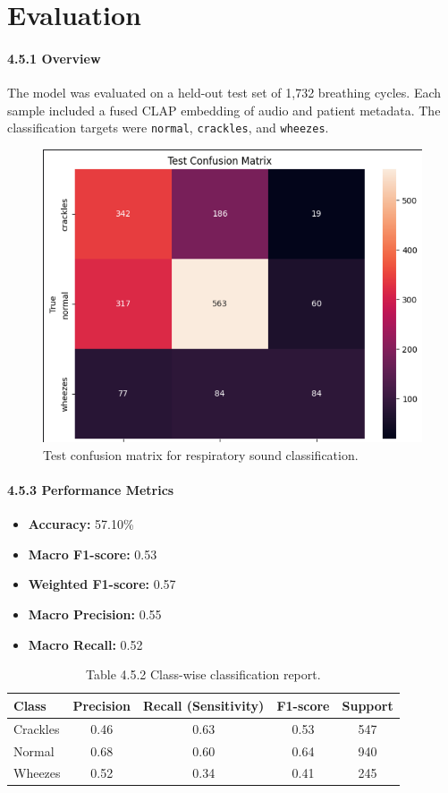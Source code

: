 \break
\section{Evaluation}

\paragraph{4.5.1 Overview\\}
The model was evaluated on a held-out test set of 1,732 breathing cycles. Each sample included a fused CLAP embedding of audio and patient metadata. The classification targets were \texttt{normal}, \texttt{crackles}, and \texttt{wheezes}.

\begin{figure}[htbp]
    \centering
    \includegraphics[width=0.7\linewidth]{Chapter4/pic.png}
    \caption{Test confusion matrix for respiratory sound classification.}
    \label{fig:confusion-matrix}
\end{figure}

\paragraph{4.5.3 Performance Metrics\\}
\begin{itemize}
    \item \textbf{Accuracy:} 57.10\%
    \item \textbf{Macro F1-score:} 0.53
    \item \textbf{Weighted F1-score:} 0.57
    \item \textbf{Macro Precision:} 0.55
    \item \textbf{Macro Recall:} 0.52
\end{itemize}

\begin{table}[htbp]
\centering
\begin{tabular}{|l|c|c|c|c|}
\hline
\textbf{Class} & \textbf{Precision} & \textbf{Recall (Sensitivity)} & \textbf{F1-score} & \textbf{Support} \\
\hline
Crackles & 0.46 & 0.63 & 0.53 & 547 \\
Normal   & 0.68 & 0.60 & 0.64 & 940 \\
Wheezes  & 0.52 & 0.34 & 0.41 & 245 \\
\hline
\end{tabular}
\caption*{Table 4.5.2 Class-wise classification report.}
\end{table}

